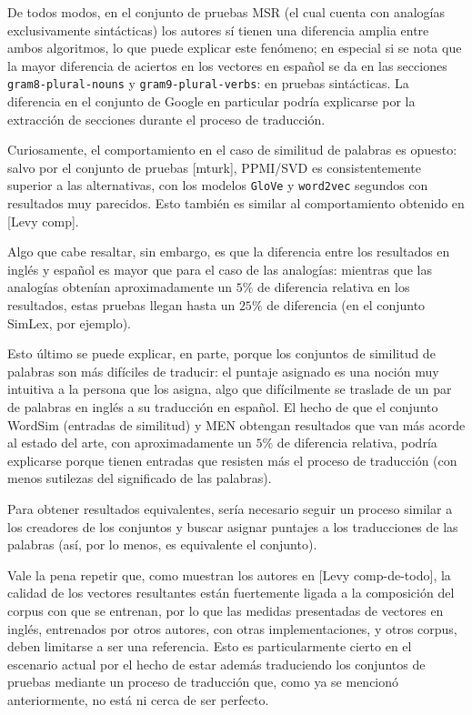 De todos modos, en el conjunto de pruebas MSR (el cual cuenta con analogías exclusivamente
sintácticas) los autores sí tienen una diferencia amplia entre ambos algoritmos, lo que puede
explicar este fenómeno; en especial si se nota que la mayor diferencia de aciertos en los vectores
en español se da en las secciones \texttt{gram8-plural-nouns} y \texttt{gram9-plural-verbs}: en
pruebas sintácticas. La diferencia en el conjunto de Google en particular podría explicarse por la
extracción de secciones durante el proceso de traducción.


Curiosamente, el comportamiento en el caso de similitud de palabras es opuesto: salvo por el
conjunto de pruebas [mturk], PPMI/SVD es consistentemente superior a las alternativas, con los
modelos \texttt{GloVe} y \texttt{word2vec} segundos con resultados muy parecidos. Esto también es
similar al comportamiento obtenido en [Levy comp].

Algo que cabe resaltar, sin embargo, es que la diferencia entre los resultados en inglés y español
es mayor que para el caso de las analogías: mientras que las analogías obtenían aproximadamente un
$5\%$ de diferencia relativa en los resultados, estas pruebas llegan hasta un $25\%$ de diferencia
(en el conjunto SimLex, por ejemplo).

Esto último se puede explicar, en parte, porque los conjuntos de similitud de palabras son más
difíciles de traducir: el puntaje asignado es una noción muy intuitiva a la persona que los asigna,
algo que difícilmente se traslade de un par de palabras en inglés a su traducción en español. El
hecho de que el conjunto WordSim (entradas de similitud) y MEN obtengan resultados que van más
acorde al estado del arte, con aproximadamente un $5\%$ de diferencia relativa, podría explicarse
porque tienen entradas que resisten más el proceso de traducción (con menos sutilezas del
significado de las palabras).

Para obtener resultados equivalentes, sería necesario seguir un proceso similar a los creadores de
los conjuntos y buscar asignar puntajes a los traducciones de las palabras (así, por lo menos, es
equivalente el conjunto).


Vale la pena repetir que, como muestran los autores en [Levy comp-de-todo], la calidad de los
vectores resultantes están fuertemente ligada a la composición del corpus con que se entrenan, por
lo que las medidas presentadas de vectores en inglés, entrenados por otros autores, con otras
implementaciones, y otros corpus, deben limitarse a ser una referencia. Esto es particularmente
cierto en el escenario actual por el hecho de estar además traduciendo los conjuntos de pruebas
mediante un proceso de traducción que, como ya se mencionó anteriormente, no está ni cerca de ser
perfecto.



